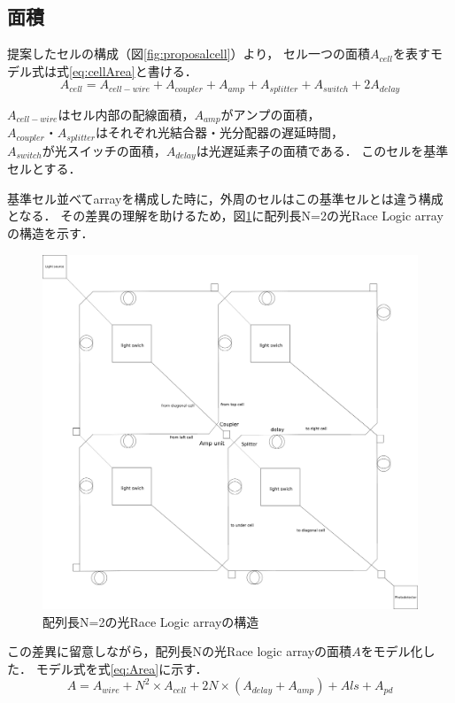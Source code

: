 \subsection{面積}
提案したセルの構成（図\ref{fig:proposalcell}）より，
セル一つの面積$A_{cell}$を表すモデル式は式\ref{eq:cellArea}と書ける．
\begin{equation}
A_{cell} = A_{cell-wire}+A_{coupler}+A_{amp}+A_{splitter}+A_{switch}+2A_{delay}
\label{eq:cellArea}
\end{equation}

$A_{cell-wire}はセル内部の配線面積，A_{amp}がアンプの面積，$
$A_{coupler}・A_{splitter}はそれぞれ光結合器・光分配器の遅延時間，$
$A_{switch}が光スイッチの面積，A_{delay}は光遅延素子の面積である．$
このセルを基準セルとする．

基準セル並べてarrayを構成した時に，外周のセルはこの基準セルとは違う構成となる．
その差異の理解を助けるため，図\ref{fig:N=2}に配列長N=2の光Race Logic arrayの構造を示す．
\begin{figure}[t!]
\begin{center}
\includegraphics[keepaspectratio,scale=0.35]{fig/4/lightracelogic_N_2.png}
\caption{配列長N=2の光Race Logic arrayの構造}
\label{fig:N=2}
\end{center}
\end{figure}

この差異に留意しながら，配列長Nの光Race logic arrayの面積$A$をモデル化した．
モデル式を式\ref{eq:Area}に示す．
\begin{equation}
A = A_{wire}+N^2 \times A_{cell} + 2N \times (A_{delay}+A_{amp}) +A{ls}+A_{pd}
\label{eq:Area}
\end{equation}

